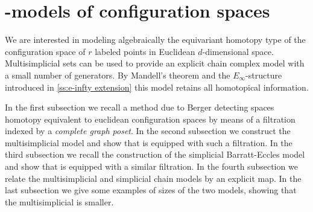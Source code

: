 
\section{\pdfEinfty-models of configuration spaces}

We are interested in modeling algebraically the equivariant homotopy type of the configuration space of $r$ labeled points in Euclidean $d$-dimensional space.
Multisimplicial sets can be used to provide an explicit chain complex model with a small number of generators.
By Mandell's theorem \cite{mandell2006homotopy_type} and the $E_\infty$-structure introduced in \cref{ss:e-infty extension} this model retains all homotopical information.

In the first subsection we recall a method due to Berger detecting spaces homotopy equivalent to euclidean configuration spaces by means of a filtration indexed by a {\em complete graph poset}.
In the second subsection we construct the multisimplicial model and show that is equipped with such a filtration.
In the third subsection we recall the construction of the simplicial Barratt-Eccles model and show that is  equipped with a similar filtration.
In the fourth subsection we relate the multisimplicial and simplicial chain models by an explicit map. In the last subsection we give some examples of sizes of the two models, showing that the multisimplicial is smaller.






